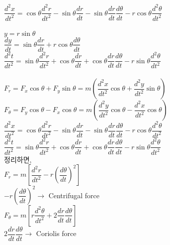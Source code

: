 \documentclass[a4paper]{article}
\begin{document}
$\dfrac{d^{2}x}{dt^{2}} = \cos \theta \dfrac{d^{2}r}{dt^{2}} - \sin \theta \dfrac{dr}{dt} - \sin \theta \dfrac{dr}{dt} \dfrac{d\theta}{dt} -r \cos \theta \dfrac{d^{2}\theta}{dt^{2}}$\\
\\
$ y = r \sin \theta $ \\

$\dfrac{dy}{dt} = \sin \theta \dfrac{dr}{dt} + r \cos \theta \dfrac{d\theta}{dt}$ \\

$\dfrac{d^{2}t}{dt^{2}} = \sin \theta \dfrac{d^{2}r}{dt^{2}} + \cos \theta \dfrac{dr}{dt} + \cos \theta \dfrac{dr}{dt} \dfrac{d\theta}{dt} -r \sin \theta \dfrac{d^{2}\theta}{dt^{2}}$\\
\\



$ F_{r} = F_{x} \cos \theta + F_{y} \sin \theta 
= m \left ( \dfrac{d^{2}x}{dt^{2}} \cos \theta + \dfrac{d^{2}y}{dt^{2}} \sin \theta \right) $\\

$ F_{\theta} = F_{y} \cos \theta - F_{x} \cos \theta 
= m \left ( \dfrac{d^{2}y}{dt^{2}} \cos \theta - \dfrac{d^{2}x}{dt^{2}} \cos \theta \right) $\\

$\dfrac{d^{2}x}{dt^{2}} = \cos \theta \dfrac{d^{2}r}{dt^{2}} - \sin \theta \dfrac{dr}{dt} - \sin \theta \dfrac{dr}{dt} \dfrac{d\theta}{dt} -r \cos \theta \dfrac{d^{2}\theta}{dt^{2}}$\\

$\dfrac{d^{2}t}{dt^{2}} = \sin \theta \dfrac{d^{2}r}{dt^{2}} + \cos \theta \dfrac{dr}{dt} + \cos \theta \dfrac{dr}{dt} \dfrac{d\theta}{dt} -r \sin \theta \dfrac{d^{2}\theta}{dt^{2}}$\\


정리하면, \\

$ F_{r} = m \left[ \dfrac{d^{2}r}{dt^{2}} - r \left( {\dfrac{d \theta}{dt}} \right)^{2} \right] $\\

$ -r \left( {\dfrac{d \theta}{dt}} \right)^{2} \rightarrow $ Centrifugal force \\

$ F_{\theta} = m \left[ r \dfrac{d^{2}\theta}{dt^{2}} + 2 \dfrac{dr}{dt} \dfrac{d\theta}{dt}  \right] $\\

$ 2 \dfrac{dr}{dt} \dfrac{d\theta}{dt} \rightarrow $ Coriolis force \\
\end{document}
